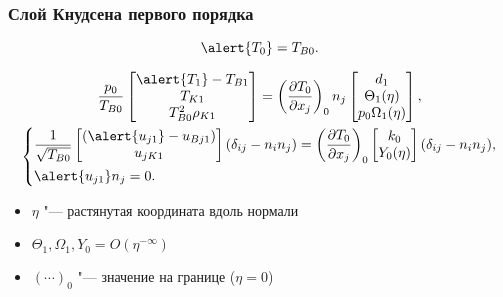 \documentclass[mathserif]{beamer} %
\newcommand{\pder}[2][]{\frac{\partial#1}{\partial#2}}
\newcommand{\OO}[1]{O(#1)}
\newcommand{\onwall}[1]{\left(#1\right)_0}
\newcommand{\deltann}[2]{(\delta_{#1#2}-n_#1 n_#2)}
\begin{document}
\begin{frame}
    \frametitle{Слой Кнудсена первого порядка}
    \begin{equation}
        \alert{T_0} = T_{B0}. \label{eq:bc_T0}
    \end{equation}

    \begin{gather}
        \frac{p_0}{T_{B0}}
            \begin{bmatrix} \alert{T_1} - T_{B1} \\ T_{K1} \\ T_{B0}^2\rho_{K1} \end{bmatrix} =
            \onwall{\pder[T_0]{x_j}} n_j \begin{bmatrix} d_1 \\ \Theta_1(\eta) \\ p_0\Omega_1(\eta) \end{bmatrix}, \\
        \left\{
        \begin{aligned}
            & \frac1{\sqrt{T_{B0}}}\begin{bmatrix} (\alert{u_{j1}} - u_{Bj1}) \\ u_{jK1} \end{bmatrix} \deltann{i}{j} =
                \onwall{\pder[T_0]{x_j}}\begin{bmatrix} k_0 \\ Y_0(\eta) \end{bmatrix}\deltann{i}{j}, \\
            & \alert{u_{j1}} n_j = 0.
        \end{aligned}
        \right.
    \end{gather}
    \vspace{-20pt}
    \begin{itemize}
        \item \(\eta\) "--- растянутая координата вдоль нормали
        \item \(\Theta_1, \Omega_1, Y_0 = \OO{\eta^{-\infty}}\)
        \item \(\onwall{\cdots}\) "--- значение на границе (\(\eta=0\))
    \end{itemize}
\end{frame}
\end{document}
